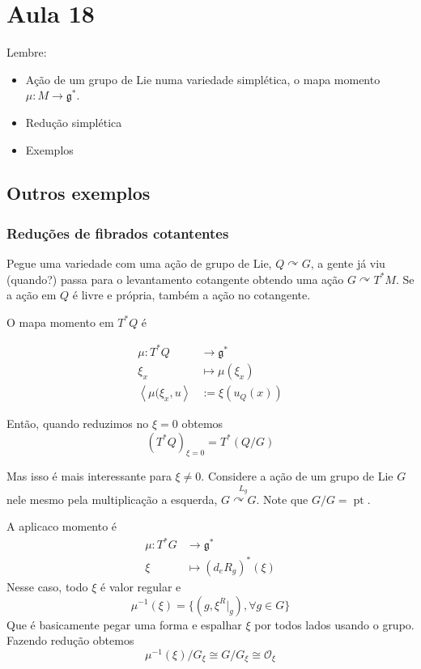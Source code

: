 \section{Aula 18}

Lembre:
\begin{itemize}
\item Ação de um grupo de Lie numa variedade simplética, o mapa momento $\mu:M\longrightarrow \mathfrak{g}^*$.
\item Redução simplética
\item Exemplos
\end{itemize}

\subsection{Outros exemplos}

\subsubsection{Reduções de fibrados cotantentes}

Pegue uma variedade com uma ação de grupo de Lie, $Q\curvearrowright G$, a gente já viu (quando?) passa para o levantamento cotangente obtendo uma ação $G\curvearrowright T^*M$. Se a ação em $Q$ é livre e própria, também a ação no cotangente.

O mapa momento em $T^*Q$ é

\begin{align*}
	\mu:T^*Q  &\longrightarrow \mathfrak{g}^* \\
	\xi_x &\longmapsto \mu(\xi_x)\\
	\left<\mu(\xi_x,u\right> &:=\xi(u_Q(x))
\end{align*}


Então, quando reduzimos no $\xi=0$ obtemos
\[(T^* Q)_{\xi=0}=T^*(Q/G)\]

Mas isso é mais interessante para $\xi\neq 0$. Considere a  ação de um grupo de Lie $G$ nele mesmo pela multiplicação a esquerda, $G\overset{L_g}{\curvearrowright G}$. Note que $G/G=\operatorname{pt}$.

A aplicaco momento é
\begin{align*}
	\mu: T^*G &\longrightarrow \mathfrak{g}^* \\
	\xi &\longmapsto (d_eR_g)^*(\xi)
\end{align*}
Nesse caso, todo $\xi$ é valor regular e
\[\mu^{-1}(\xi)=\{(g,\xi^R|_{g}),\forall g\in G\}\]
Que é basicamente pegar uma forma e espalhar $\xi$ por todos lados usando o grupo. Fazendo redução obtemos
\[\mu^{-1}(\xi)/G_\xi\cong G/G_\xi\cong \mathcal{O}_\xi\]

